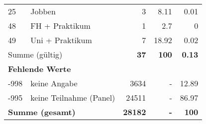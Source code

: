 \begin{longtable}{lXrrr}
     25 &
     \multicolumn{1}{X}{ Jobben   } &


       \num{3} &
       \num[round-mode=places,round-precision=2]{8,11} &
         \num[round-mode=places,round-precision=2]{0,01} \\

     48 &
     \multicolumn{1}{X}{ FH + Praktikum   } &


       \num{1} &
       \num[round-mode=places,round-precision=2]{2,7} &
         \num[round-mode=places,round-precision=2]{0} \\

     49 &
     \multicolumn{1}{X}{ Uni + Praktikum   } &


       \num{7} &
       \num[round-mode=places,round-precision=2]{18,92} &
         \num[round-mode=places,round-precision=2]{0,02} \\
     \midrule
     \multicolumn{2}{l}{Summe (gültig)} &
       \textbf{\num{37}} &
     \textbf{100} &
       \textbf{\num[round-mode=places,round-precision=2]{0,13}} \\
     \multicolumn{5}{l}{\textbf{Fehlende Werte}}\\
       -998 &
       keine Angabe &
         \num{3634} &
        - &
         \num[round-mode=places,round-precision=2]{12,89} \\
       -995 &
       keine Teilnahme (Panel) &
         \num{24511} &
        - &
         \num[round-mode=places,round-precision=2]{86,97} \\
     \midrule
     \multicolumn{2}{l}{\textbf{Summe (gesamt)}} &
          \textbf{\num{28182}} &
        \textbf{-} &
        \textbf{100} \\
     \bottomrule
     \end{longtable}
     
